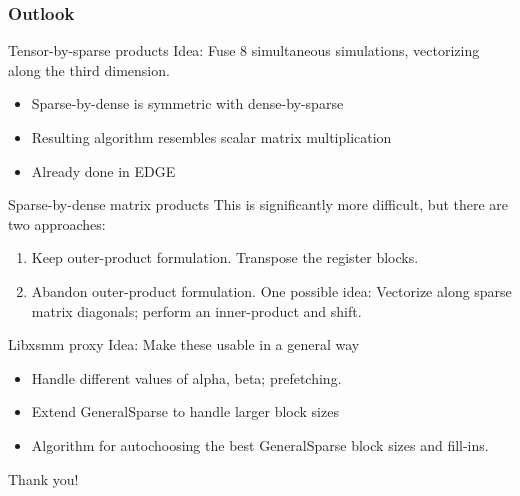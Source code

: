 \documentclass[9pt]{beamer}
\begin{document}
\begin{frame}[fragile]
  \frametitle{Outlook}

  \begin{block}{Tensor-by-sparse products}
  Idea: Fuse 8 simultaneous simulations, vectorizing along the third dimension.
    \begin{itemize}
    \item Sparse-by-dense is symmetric with dense-by-sparse
    \item Resulting algorithm resembles scalar matrix multiplication
    \item Already done in EDGE
    \end{itemize}
  \end{block}

  \begin{block}{Sparse-by-dense matrix products}
  This is significantly more difficult, but there are two approaches:
    \begin{enumerate}
    \item Keep outer-product formulation. Transpose the register blocks.
    \item Abandon outer-product formulation. One possible idea: Vectorize along sparse matrix diagonals; perform an inner-product and shift.
    \end{enumerate}
  \end{block}

  \begin{block}{Libxsmm proxy}
  Idea: Make these usable in a general way
    \begin{itemize}
    \item Handle different values of alpha, beta; prefetching. 
    \item Extend GeneralSparse to handle larger block sizes
    \item Algorithm for autochoosing the best GeneralSparse block sizes and fill-ins.
    \end{itemize}
  \end{block}

\end{frame}




\begin{frame}[plain,c]
\begin{center}
    \huge Thank you!
\end{center}
\end{frame}
\end{document}
